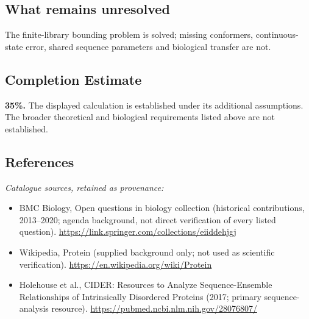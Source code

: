 \documentclass[11pt]{article}
\begin{document}
\subsection{What remains unresolved}
The finite-library bounding problem is solved; missing conformers, continuous-state error, shared sequence parameters and biological transfer are not.
\subsection{Completion Estimate}
\textbf{35\%.} The displayed calculation is established under its additional assumptions. The broader theoretical and biological requirements listed above are not established.
\subsection{References}
\noindent\emph{Catalogue sources, retained as provenance:}
\begin{itemize}
\item BMC Biology, Open questions in biology collection (historical contributions, 2013--2020; agenda background, not direct verification of every listed question). \url{https://link.springer.com/collections/eiiddehjgj}
\item Wikipedia, Protein (supplied background only; not used as scientific verification). \url{https://en.wikipedia.org/wiki/Protein}
\item Holehouse et al., CIDER: Resources to Analyze Sequence-Ensemble Relationships of Intrinsically Disordered Proteins (2017; primary sequence-analysis resource). \url{https://pubmed.ncbi.nlm.nih.gov/28076807/}
\end{itemize}
\clearpage


\appendix
\end{document}
